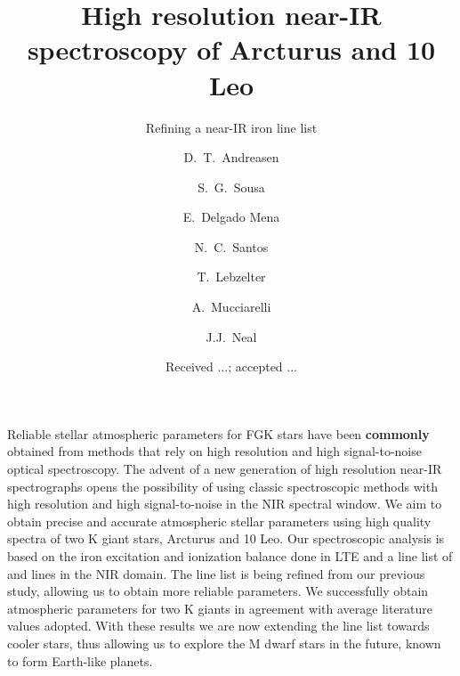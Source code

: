 \documentclass{aa}
\begin{document}
\title{High resolution near-IR spectroscopy of Arcturus and 10 Leo}
\subtitle{Refining a near-IR iron line list}


\author{ D.~T.~Andreasen
    \and S.~G.~Sousa
    \and E.~Delgado Mena
    \and N.~C.~Santos
    \and T.~Lebzelter
    \and A.~Mucciarelli
    \and J.J.~Neal}







\date{Received ...; accepted ...}

\abstract
{Reliable stellar atmospheric parameters for FGK stars have been {\bf commonly}
obtained from methods that rely on high resolution and high signal-to-noise
optical spectroscopy. The advent of a new generation of high resolution near-IR
spectrographs opens the possibility of using classic spectroscopic methods with
high resolution and high signal-to-noise in the NIR spectral window.}
{We aim to obtain precise and accurate atmospheric stellar parameters using high
quality spectra of two K giant stars, Arcturus and 10 Leo.}
{Our spectroscopic analysis is based on the iron excitation and ionization
balance done in LTE and a line list of  and  lines in the
NIR domain. The line list is being refined from our previous study, allowing us
to obtain more reliable parameters.}
{We successfully obtain atmospheric parameters for two K giants in agreement
with average literature values adopted.}
{With these results we are now extending the line list towards cooler stars,
thus allowing us to explore the M dwarf stars in the future, known to form
Earth-like planets.}



\maketitle
\end{document}
